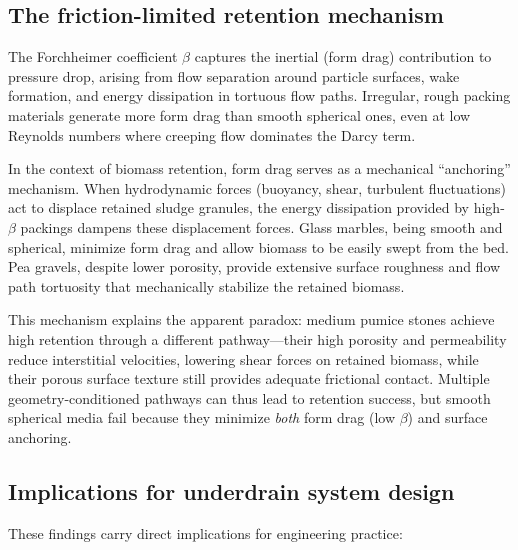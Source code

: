 \documentclass[12pt,a4paper]{article}
\begin{document}
\subsection{The friction-limited retention mechanism}

The Forchheimer coefficient $\beta$ captures the inertial (form drag) contribution to pressure drop, arising from flow separation around particle surfaces, wake formation, and energy dissipation in tortuous flow paths. Irregular, rough packing materials generate more form drag than smooth spherical ones, even at low Reynolds numbers where creeping flow dominates the Darcy term.

In the context of biomass retention, form drag serves as a mechanical ``anchoring'' mechanism. When hydrodynamic forces (buoyancy, shear, turbulent fluctuations) act to displace retained sludge granules, the energy dissipation provided by high-$\beta$ packings dampens these displacement forces. Glass marbles, being smooth and spherical, minimize form drag and allow biomass to be easily swept from the bed. Pea gravels, despite lower porosity, provide extensive surface roughness and flow path tortuosity that mechanically stabilize the retained biomass.

This mechanism explains the apparent paradox: medium pumice stones achieve high retention through a different pathway---their high porosity and permeability reduce interstitial velocities, lowering shear forces on retained biomass, while their porous surface texture still provides adequate frictional contact. Multiple geometry-conditioned pathways can thus lead to retention success, but smooth spherical media fail because they minimize \emph{both} form drag (low $\beta$) and surface anchoring.

\subsection{Implications for underdrain system design}

These findings carry direct implications for engineering practice:
\end{document}

